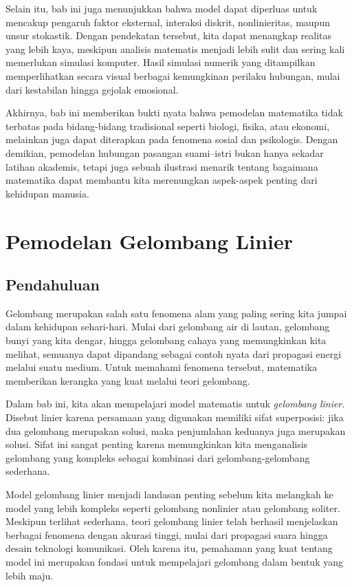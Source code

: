 \documentclass{bukumjh}
\begin{document}
Selain itu, bab ini juga menunjukkan bahwa model dapat diperluas untuk mencakup pengaruh faktor eksternal, interaksi diskrit, nonlinieritas, maupun unsur stokastik. 
Dengan pendekatan tersebut, kita dapat menangkap realitas yang lebih kaya, meskipun analisis matematis menjadi lebih sulit dan sering kali memerlukan simulasi komputer. 
Hasil simulasi numerik yang ditampilkan memperlihatkan secara visual berbagai kemungkinan perilaku hubungan, mulai dari kestabilan hingga gejolak emosional.

Akhirnya, bab ini memberikan bukti nyata bahwa pemodelan matematika tidak terbatas pada bidang-bidang tradisional seperti biologi, fisika, atau ekonomi, melainkan juga dapat diterapkan pada fenomena sosial dan psikologis. 
Dengan demikian, pemodelan hubungan pasangan suami--istri bukan hanya sekadar latihan akademis, tetapi juga sebuah ilustrasi menarik tentang bagaimana matematika dapat membantu kita merenungkan aspek-aspek penting dari kehidupan manusia.

\chapter{Pemodelan Gelombang Linier}

\section{Pendahuluan}

Gelombang merupakan salah satu fenomena alam yang paling sering kita jumpai dalam kehidupan sehari-hari. 
Mulai dari gelombang air di lautan, gelombang bunyi yang kita dengar, hingga gelombang cahaya yang memungkinkan kita melihat, semuanya dapat dipandang sebagai contoh nyata dari propagasi energi melalui suatu medium. 
Untuk memahami fenomena tersebut, matematika memberikan kerangka yang kuat melalui teori gelombang.

Dalam bab ini, kita akan mempelajari model matematis untuk \emph{gelombang linier}. 
Disebut linier karena persamaan yang digunakan memiliki sifat superposisi: jika dua gelombang merupakan solusi, maka penjumlahan keduanya juga merupakan solusi. 
Sifat ini sangat penting karena memungkinkan kita menganalisis gelombang yang kompleks sebagai kombinasi dari gelombang-gelombang sederhana.

Model gelombang linier menjadi landasan penting sebelum kita melangkah ke model yang lebih kompleks seperti gelombang nonlinier atau gelombang soliter. 
Meskipun terlihat sederhana, teori gelombang linier telah berhasil menjelaskan berbagai fenomena dengan akurasi tinggi, mulai dari propagasi suara hingga desain teknologi komunikasi. 
Oleh karena itu, pemahaman yang kuat tentang model ini merupakan fondasi untuk mempelajari gelombang dalam bentuk yang lebih maju.
\end{document}
